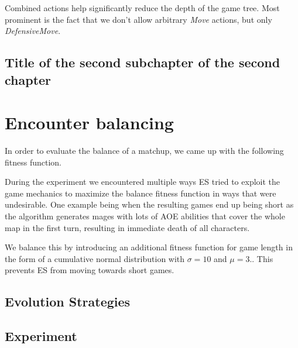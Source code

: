 Combined actions help significantly reduce the depth of the game tree. Most
prominent is the fact that we don't allow arbitrary \emph{Move} actions, but
only \emph{DefensiveMove}.

\section{Title of the second subchapter of the second chapter}

\chapter{Encounter balancing}

In order to evaluate the balance of a matchup, we came up with the following fitness function.


During the experiment we encountered multiple ways ES tried to exploit the game
mechanics to maximize the balance fitness function in ways that were
undesirable. One example being when the resulting games end up being short as
the algorithm generates mages with lots of AOE abilities that cover the whole
map in the first turn, resulting in immediate death of all characters.

We balance this by introducing an additional fitness function for game length
in the form of a cumulative normal distribution with $\sigma = 10$ and $\mu =
3$..  This prevents ES from moving towards
short games.

\section{Evolution Strategies}



\section{Experiment}
